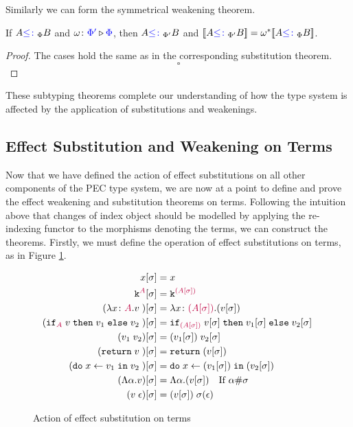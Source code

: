 \documentclass{Report}
\begin{document}
Similarly we can form the symmetrical weakening theorem.

\begin{framed}
    \begin{theorem}\label{EffectWeakeningOnSubtyping}
        If $A {\color{blue} \leq\colon}_\Phi B$ and $\omega \colon {\color{blue}\Phi'} \triangleright {\color {blue} \Phi}$, then $A {\color{blue} \leq\colon}_{\Phi'} B$ and ${\bf [\![}A{\color{blue} \leq\colon}_{\Phi'} B{\bf ]\!]} = \omega^*{\bf [\![}A{\color{blue} \leq\colon}_\Phi B{\bf ]\!]}$.
    \end{theorem}
    
    
    \begin{proof}
        The cases hold the same as in the corresponding substitution theorem.
        $$\square$$
    \end{proof}
\end{framed}

These subtyping theorems complete our understanding of how the type system is affected by the application of substitutions and weakenings.

\subsection{Effect Substitution and Weakening on Terms}
Now that we have defined the action of effect substitutions on all other components of the PEC type system, we are now at a point to define and prove the effect weakening and substitution theorems on terms. Following the intuition above that changes of index object should be modelled by applying the re-indexing functor to the morphisms denoting the terms, we can construct the theorems. Firstly, we must define the operation of effect substitutions on terms, as in Figure \ref{EffectSubstitutionActionTerms}.

\begin{figure}[H]
    \centering
    \begin{framed}
        
\begin{align*}
    x[\sigma] & = x \\
    \texttt{k}^{\color{purple} A}[\sigma] & = \texttt{k}^{\color{purple} (A[\sigma])} \\
    (\lambda x \colon {\color{purple}A}. v\;)[\sigma] &= \lambda x \colon {\color{purple}(A[\sigma])}. (v[\sigma])\;\\
    (\texttt{if}_{\textcolor{purple}{A}}\; v\; \texttt{then}\; v_1 \;\texttt{else} \; v_2\;)[\sigma] &= \texttt{if}_{\textcolor{purple}{(A[\sigma])}}\; v[\sigma]\; \texttt{then}\; v_1[\sigma] \;\texttt{else} \; v_2[\sigma]\;\\
    (v_1\; v_2)[\sigma]&= (v_1[\sigma])\; v_2[\sigma]\\
    (\texttt{return} \; v\;)[\sigma] &= \texttt{return} \;(v[\sigma])\;\\
    (\texttt{do}\; x \leftarrow v_1 \;\texttt{in}\; v_2\;)[\sigma]&= \texttt{do}\; x \leftarrow (v_1[\sigma]) \;\texttt{in}\; (v_2[\sigma])\;\\
    (\Lambda \alpha. v)[\sigma] & = \Lambda \alpha. (v[\sigma])\quad\text{If $\alpha\#\sigma$}\\
    (v\;\epsilon)[\sigma] & = (v[\sigma])\;\sigma(\epsilon)\\
\end{align*}
    \end{framed}
    
    \caption{Action of effect substitution on terms}
    \label{EffectSubstitutionActionTerms}
\end{figure}
\end{document}
